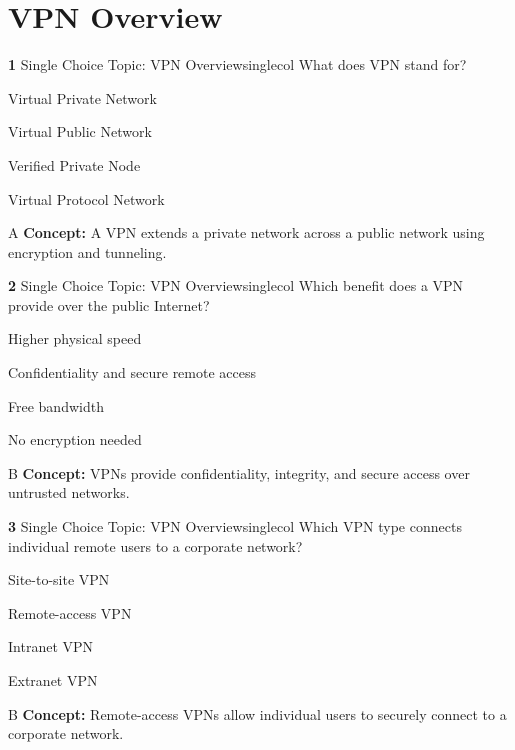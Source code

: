 \documentclass[10pt,a4paper]{article}
\begin{document}
\section{VPN Overview}
\begin{qcard}{\color{white}\textbf{1} \hfill \small Single Choice \textbar{} Topic: VPN Overview}{singlecol}
What does VPN stand for?

\begin{qoptions}
\item Virtual Private Network
\item Virtual Public Network
\item Verified Private Node
\item Virtual Protocol Network
\end{qoptions}
\begin{explainbox}{A}
\textbf{Concept:} A VPN extends a private network across a public network using encryption and tunneling.
\end{explainbox}
\end{qcard}

\begin{qcard}{\color{white}\textbf{2} \hfill \small Single Choice \textbar{} Topic: VPN Overview}{singlecol}
Which benefit does a VPN provide over the public Internet?

\begin{qoptions}
\item Higher physical speed
\item Confidentiality and secure remote access
\item Free bandwidth
\item No encryption needed
\end{qoptions}
\begin{explainbox}{B}
\textbf{Concept:} VPNs provide confidentiality, integrity, and secure access over untrusted networks.
\end{explainbox}
\end{qcard}

\begin{qcard}{\color{white}\textbf{3} \hfill \small Single Choice \textbar{} Topic: VPN Overview}{singlecol}
Which VPN type connects individual remote users to a corporate network?

\begin{qoptions}
\item Site-to-site VPN
\item Remote-access VPN
\item Intranet VPN
\item Extranet VPN
\end{qoptions}
\begin{explainbox}{B}
\textbf{Concept:} Remote-access VPNs allow individual users to securely connect to a corporate network.
\end{explainbox}
\end{qcard}
\end{document}
